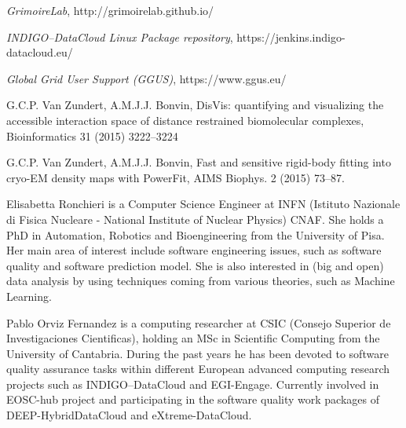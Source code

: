 \documentclass[journal]{IEEEtran}
\begin{document}
\begin{thebibliography}{1}
\emph{GrimoireLab}, http://grimoirelab.github.io/

\emph{INDIGO--DataCloud Linux Package repository}, https://jenkins.indigo-datacloud.eu/

\emph{Global Grid User Support (GGUS)}, https://www.ggus.eu/

 G.C.P. Van Zundert, A.M.J.J. Bonvin,
DisVis: quantifying and visualizing the accessible interaction space of distance
restrained biomolecular complexes, Bioinformatics 31 (2015) 3222–3224

 G.C.P. Van Zundert, A.M.J.J. Bonvin,
Fast and sensitive rigid-body fitting into cryo-EM density maps with PowerFit,
AIMS Biophys. 2 (2015) 73–87.

\end{thebibliography}

\begin{IEEEbiography} {Elisabetta Ronchieri}
is a Computer Science Engineer at INFN (Istituto Nazionale di Fisica Nucleare - National Institute of Nuclear Physics) CNAF. She holds a PhD in Automation, Robotics and Bioengineering from the University of Pisa. Her main area of interest include software engineering issues, such as software quality and software prediction model. She is also interested in (big and open) data analysis by using techniques coming from various theories, such as Machine Learning.
\end{IEEEbiography}

\begin{IEEEbiography}{Pablo Orviz Fernandez}
is a computing researcher at CSIC (Consejo Superior de Investigaciones
Cientificas), holding an MSc in Scientific Computing from the University of
Cantabria. During the past years he has been devoted to software quality
assurance tasks within different European advanced computing research projects
such as INDIGO--DataCloud and EGI-Engage. Currently involved in EOSC-hub project
and participating in the software quality work packages of DEEP-HybridDataCloud
and eXtreme-DataCloud.
\end{IEEEbiography}
\end{document}

